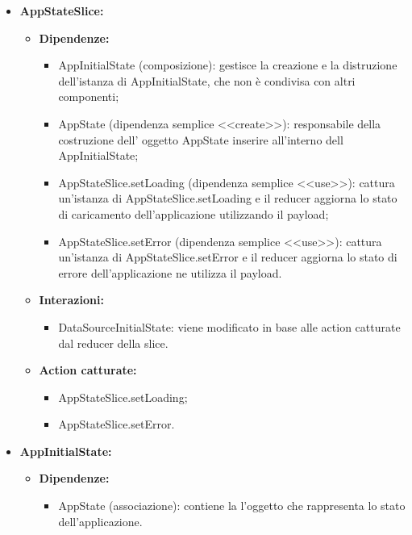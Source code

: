 \begin{itemize}
    \item \textbf{AppStateSlice:}
    \begin{itemize}
        \item \textbf{Dipendenze:}
        \begin{itemize}
            \item AppInitialState (composizione): gestisce la creazione e la distruzione dell'istanza di AppInitialState, che non è condivisa con altri componenti;
            \item AppState (dipendenza semplice <<create>>): responsabile della costruzione dell' oggetto AppState inserire all’interno dell AppInitialState;
            \item AppStateSlice.setLoading (dipendenza semplice <<use>>): cattura un’istanza di AppStateSlice.setLoading e il reducer aggiorna lo stato di caricamento dell'applicazione utilizzando il payload;
            \item AppStateSlice.setError (dipendenza semplice <<use>>): cattura un’istanza di AppStateSlice.setError e il reducer aggiorna lo stato di errore dell'applicazione ne utilizza il payload.
        \end{itemize} 
        \item \textbf{Interazioni:}
        \begin{itemize}
            \item DataSourceInitialState: viene modificato in base alle action catturate dal reducer della slice.
        \end{itemize} 
        \item \textbf{Action catturate:}
        \begin{itemize}
            \item AppStateSlice.setLoading;
            \item AppStateSlice.setError.
        \end{itemize} 
    \end{itemize}

    
    \item \textbf{AppInitialState:}
    \begin{itemize}
        \item \textbf{Dipendenze:}
        \begin{itemize}
            \item AppState (associazione): contiene la l'oggetto che rappresenta lo stato dell'applicazione.
        \end{itemize} 
    \end{itemize}


\end{itemize}
